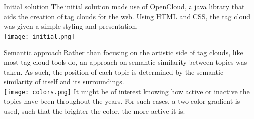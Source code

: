 \documentclass[a0paper, portrait]{baposter}
\begin{document}
\begin{poster}
  \begin{posterbox}[name=initial, column=0, below=tech]{Initial solution} {
    The initial solution made use of OpenCloud, a java library that aids the creation of tag clouds for the web. Using HTML and CSS, the tag cloud was given a simple styling and presentation. \\
    
    \texttt{[image: initial.png]}
    \label{fig:2}
  }
  \end{posterbox}

  \begin{posterbox}[name=semantic, column=1, row=0]{Semantic approach} {
    Rather than focusing on the artistic side of tag clouds, like most tag cloud tools do, an approach on semantic similarity between topics was taken. As such, the position of each topic is determined by the semantic similarity of itself and its surroundings.\\[3ex]
    \texttt{[image: colors.png]}
    \label{fig:3}     
    It might be of interest knowing how active or inactive the topics have been throughout the years. For such cases, a two-color gradient is used, such that the brighter the color, the more active it is. 
  }
  \end{posterbox}
  

\end{poster}
\end{document}
